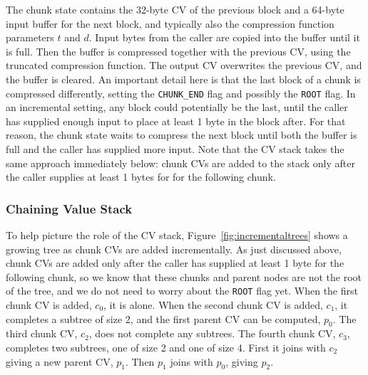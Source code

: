 \documentclass[11pt,notitlepage,a4paper]{article}
\begin{document}
The chunk state contains the 32-byte CV of the previous block and a 64-byte
input buffer for the next block, and typically also the compression function
parameters $t$ and $d$. Input bytes from the caller are copied into the buffer
until it is full. Then the buffer is compressed together with the previous CV,
using the truncated compression function. The output CV overwrites the previous
CV, and the buffer is cleared. An important detail here is that the last block
of a chunk is compressed differently, setting the \texttt{CHUNK\_END} flag and
possibly the \texttt{ROOT} flag. In an incremental setting, any block could
potentially be the last, until the caller has supplied enough input to place at
least 1 byte in the block after. For that reason, the chunk state waits to
compress the next block until both the buffer is full and the caller has
supplied more input. Note that the CV stack takes the same approach immediately
below: chunk CVs are added to the stack only after the caller supplies at least
1 bytes for for the following chunk.

\subsubsection{Chaining Value Stack}\label{sec:cvstack}

To help picture the role of the CV stack, Figure~\ref{fig:incrementaltrees}
shows a growing tree as chunk CVs are added incrementally. As just discussed
above, chunk CVs are added only after the caller has supplied at least 1 byte
for the following chunk, so we know that these chunks and parent nodes are not
the root of the tree, and we do not need to worry about the \texttt{ROOT} flag
yet. When the first chunk CV is added, $c_0$, it is alone. When the second
chunk CV is added, $c_1$, it completes a subtree of size 2, and the first
parent CV can be computed, $p_0$. The third chunk CV, $c_2$, does not complete
any subtrees. The fourth chunk CV, $c_3$, completes two subtrees, one of size 2
and one of size 4. First it joins with $c_2$ giving a new parent CV, $p_1$.
Then $p_1$ joins with $p_0$, giving $p_2$.
\end{document}
